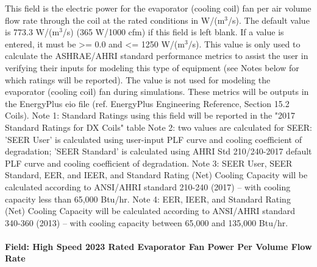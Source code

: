 This field is the electric power for the evaporator (cooling coil) fan per air volume flow rate through the coil at the rated conditions in W/(m\(^{3}\)/s). The default value is 773.3 W/(m\(^{3}\)/s) (365 W/1000 cfm) if this field is left blank. If a value is entered, it must be \textgreater{}= 0.0 and \textless{}= 1250 W/(m\(^{3}\)/s). This value is only used to calculate the ASHRAE/AHRI standard performance metrics to assist the user in verifying their inputs for modeling this type of equipment (see Notes below for which ratings will be reported).  The value is not used for modeling the evaporator (cooling coil) fan during simulations.  These metrics will be outputs in the EnergyPlus eio file (ref. EnergyPlus Engineering Reference, Section 15.2 Coils).
Note 1: Standard Ratings using this field will be reported in the "2017 Standard Ratings for DX Coils" table
Note 2: two values are calculated for SEER: 'SEER User' is calculated using user-input PLF curve and cooling coefficient of degradation; 'SEER Standard' is calculated using AHRI Std 210/240-2017 default PLF curve and cooling coefficient of degradation.
Note 3: SEER User, SEER Standard, EER, and IEER, and Standard Rating (Net) Cooling Capacity will be calculated according to ANSI/AHRI standard 210-240 (2017) -- with cooling capacity less than 65,000 Btu/hr.
Note 4: EER, IEER, and Standard Rating (Net) Cooling Capacity will be calculated according to ANSI/AHRI standard 340-360 (2013) -- with cooling capacity between 65,000 and 135,000 Btu/hr.

\paragraph{Field: High Speed 2023 Rated Evaporator Fan Power Per Volume Flow Rate}

